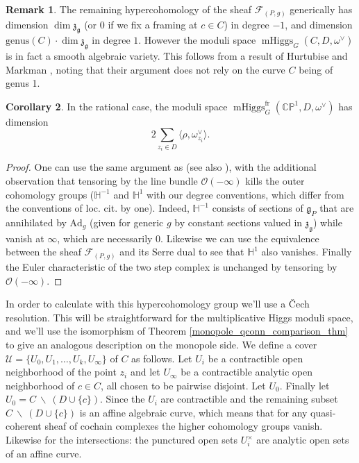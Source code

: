 \documentclass[11pt, oneside, reqno]{amsart}
\theoremstyle{definition} \newtheorem{definition}{Definition}[section]
\newtheorem{corollary}[definition]{Corollary}
\theoremstyle{definition} \newtheorem{remark}[definition]{Remark}
\theoremstyle{definition} \newtheorem{remarks}[definition]{Remarks}
\theoremstyle{definition} \newtheorem{question}[definition]{Question}
\theoremstyle{definition} \newtheorem*{note}{Note}
\theoremstyle{definition} \newtheorem{example}[definition]{Example}
\theoremstyle{definition} \newtheorem{examples}[definition]{Examples}
\renewcommand{\gg}{\mathfrak{g}}
\newcommand{\bb}[1]{\mathbb{#1}}
\newcommand{\mr}[1]{\mathrm{#1}}
\newcommand{\mc}[1]{\mathcal{#1}}
\newcommand{\mf}[1]{\mathfrak{#1}}
\newcommand{\bs}{\ \backslash \ }
\newcommand{\OO}{\mathcal{O}}
\DeclareMathOperator{\mhiggs}{mHiggs}
\newcommand{\fr}{\mathrm{fr}}
\newcommand{\Ad}{\mr{Ad}}
\begin{document}
\begin{remark}
The remaining hypercohomology of the sheaf $\mc F_{(P,g)}$ generically has dimension $\dim \mf z_{\gg}$ (or 0 if we fix a framing at $c \in C$) in degree $-1$, and dimension $\mr{genus}(C) \cdot \dim \mf z_{\gg}$ in degree $1$.  However the moduli space $\mhiggs_G(C, D,\omega^\vee)$ is in fact a smooth algebraic variety.  This follows from a result of Hurtubise and Markman \cite[Theorem 4.13]{HurtubiseMarkman}, noting that their argument does not rely on the curve $C$ being of genus 1.
\end{remark}

\begin{corollary} \label{dim_of_moduli_space_cor}
In the rational case, the moduli space $\mhiggs^\fr_G(\bb{CP}^1, D, \omega^\vee)$ has dimension 
\[2 \sum_{z_i \in D} \langle \rho, \omega^\vee_{z_i} \rangle.\]
\end{corollary}

\begin{proof}
One can use the same argument as \cite[]{HurtubiseMarkman} (see also \cite[Proposition 5.6]{CharbonneauHurtubise}), with the additional observation that tensoring by the line bundle $\OO(-\infty)$ kills the outer cohomology groups ($\bb H^{-1}$ and $\bb H^1$ with our degree conventions, which differ from the conventions of loc. cit. by one).  Indeed, $\bb H^{-1}$ consists of sections of $\gg_P$ that are annihilated by $\Ad_g$ (given for generic $g$ by constant sections valued in $\mf z_{\gg}$) while vanish at $\infty$, which are necessarily 0.  Likewise we can use the equivalence between the sheaf $\mc F_{(P,g)}$ and its Serre dual to see that $\bb H^1$ also vanishes.  Finally the Euler characteristic of the two step complex is unchanged by tensoring by $\OO(-\infty)$. 
\end{proof}

In order to calculate with this hypercohomology group we'll use a \v Cech resolution.  This will be straightforward for the multiplicative Higgs moduli space, and we'll use the isomorphism of Theorem \ref{monopole_qconn_comparison_thm} to give an analogous description on the monopole side.    We define a cover $\mc U = \{U_0, U_1, \ldots, U_k, U_\infty\}$ of $C$ as follows.  Let $U_i$ be a contractible open neighborhood of the point $z_i$ and let $U_\infty$ be a contractible analytic open neighborhood of $c \in C$, all chosen to be pairwise disjoint.  Let $U_0$.  Finally let $U_0 = C \bs (D \cup \{c\})$.  Since the $U_i$ are contractible and the remaining subset $C \bs (D \cup \{c\})$ is an affine algebraic curve, which means that for any quasi-coherent sheaf of cochain complexes the higher cohomology groups vanish.  Likewise for the intersections: the punctured open sets $U_i^\times$ are analytic open sets of an affine curve.  
\end{document}
